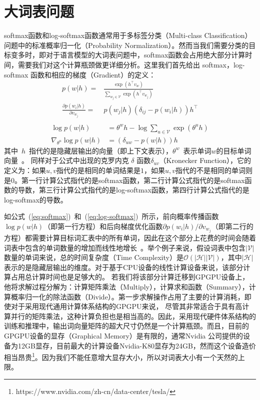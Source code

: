 \section{大词表问题}
softmax函数和log-softmax函数通常用于多标签分类（Multi-class Classification）问题中的标准概率归一化（Probability Normalization）。然而当我们需要分类的目标变多时，即对于语言模型的大词表问题中，softmax函数会占用绝大部分计算时间，需要我们对这个计算瓶颈做更详细分析。这里我们首先给出 softmax，log-softmax 函数和相应的梯度（Gradient）的定义：
\begin{equation}\label{eq:softmax}
\begin{split}
p(w|h)=&\frac{\exp(h^\top v_{w})}{\sum_{w_j\in \mathcal{V}}{\exp(h^\top v_{w_j} )}} \\
\frac{\partial p(w_i|h)}{\partial v_{w_j}}=&p(w_j|h)(\delta_{ij}-p(w_i|h))h^\top\\
\end{split}
\end{equation}
\begin{equation}
\label{eq:log-softmax}
\begin{split}
\log p(w|h) &= \theta^w h-\log \sum_{u\in \mathcal{V}}{\exp(\theta^u h)}\\
\nabla_{\theta^u}{\log p(w|h)}&= (\delta_{uw}-p(w|h))h
\end{split}
\end{equation}
其中~$h$~指代的是隐藏层输出的向量（即上下文表示），$\theta^w$~表示单词$w$的目标单词向量~。 同样对于公式中出现的克罗内克 $\delta$ 函数$ \delta_{uv}$（Kronecker Function），它的定义为：如果$ u,v $指代的是相同的单词结果是$ 1 $，如果$ u,v $指代的不是相同的单词则是$ 0 $。第一行计算公式指代的是softmax函数，第二行计算公式指代的是softmax函数的导数，第三行计算公式指代的是log-softmax函数，第四行计算公式指代的是log-softmax的导数。


如公式~(\ref{eq:softmax})~和~(\ref{eq:log-softmax})~所示，前向概率传播函数$\log p(w|h) $（即第一行方程）和后向梯度优化函数${\partial p(w_i|h)}/{\partial v_{w_j}}$（即第二行的方程）都需要计算目标词汇表中的所有单词，因此在这个部分上花费的时间会随着词表中包含的单词数量的增加而线性地增长~。举个例子来说，假设词表中包含$ \mathcal{| V |} $ 数量的单词来说，总的时间复杂度（Time Complexity）是$\mathcal{O}(\mathcal{|H ||V|})$，其中$\mathcal{|H|}$表示的是隐藏层输出的维度。对于基于CPU设备的线性计算设备来说，该部分计算占用总计算时间也是足够大的。
若我们将该部分计算迁移到GPGPU设备上，他将求解过程分解为：计算矩阵乘法（Multiply），计算求和函数（Summary），计算概率归一化的除法函数（Divide）。第一步求解操作占用了主要的计算消耗，即使对于采用现代通用计算体系结构的GPGPU来说， 尽管其非常适合于具有高计算并行的矩阵乘法，这种计算负担也是相当高的。因此，采用现代硬件体系结构的训练和推理中，输出词向量矩阵的超大尺寸仍然是一个计算瓶颈。而且，目前的GPGPU设备的显存（Graphical Memory）是有限的，通常Nvidia 公司提供的设备为12GB显存，目前最大的计算设备Nvidia-K80显存为24GB，然而这个设备造价相当昂贵\footnote{https://www.nvidia.com/zh-cn/data-center/tesla/}。因为我们不能任意增大显存大小，所以对词表大小有一个天然的上限。

